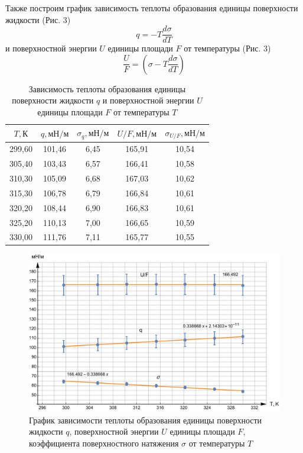 \documentclass[a4paper,12pt]{article}
\theoremstyle{plain} %
\theoremstyle{definition} %
\theoremstyle{remark} %
\begin{document}
Также построим график зависимость теплоты образования единицы поверхности жидкости (Рис. 3)
\[q = -T\frac{d\sigma}{dT}\]
и поверхностной энергии $U$ единицы площади $F$ от температуры (Рис. 3)
\[\frac{U}{F} = \left(\sigma - T\frac{d\sigma}{dT}\right) \]
\begin{table}[H]
\begin{center}
	\begin{tabular}{|c|c|c|c|c|}
		\hline
		$T, \text{К}$      & $q, \text{мН}/\text{м}$      &  $\sigma_q, \text{мН}/\text{м}$   &   $U/F, \text{мН}/\text{м}$    & $\sigma_{U/F}, \text{мН}/\text{м}$     \\ \hline
		299,60 & 101,46 & 6,45 & 165,91 & 10,54 \\ \hline
		305,40 & 103,43 & 6,57 & 166,41 & 10,58 \\ \hline
		310,30 & 105,09 & 6,68 & 167,03 & 10,62 \\ \hline
		315,30 & 106,78 & 6,79 & 166,84 & 10,61 \\ \hline
		320,20 & 108,44 & 6,90 & 166,83 & 10,61 \\ \hline
		325,20 & 110,13 & 7,00 & 166,65 & 10,59 \\ \hline
		330,00 & 111,76 & 7,11 & 165,77 & 10,55 \\ \hline
	\end{tabular}
	\captionsetup{justification=centering}
\caption{Зависимость теплоты образования единицы поверхности жидкости $q$ и поверхностной энергии $U$ единицы площади $F$ от температуры $T$}
\end{center}
\end{table}
\begin{figure}[H]
	\begin{center}
		\includegraphics[width=\linewidth]{3}
		\captionsetup{justification=centering}
		\caption{График зависимости теплоты образования единицы поверхности жидкости $q$, поверхностной энергии $U$ единицы площади $F$, коэффициента поверхностного натяжения $\sigma$ от температуры $T$}
	\end{center}
\end{figure}
\end{document}

